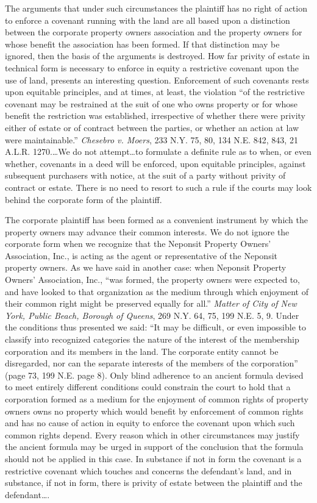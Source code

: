 The arguments that under such circumstances the plaintiff has no right of action
to enforce a covenant running with the land are all based upon a distinction
between the corporate property owners association and the property owners for
whose benefit the association has been formed. If that distinction may be
ignored, then the basis of the arguments is destroyed. How far privity of estate
in technical form is necessary to enforce in equity a restrictive covenant upon
the use of land, presents an interesting question. Enforcement of such covenants
rests upon equitable principles, and at times, at least, the violation ``of the
restrictive covenant may be restrained at the suit of one who owns property or
for whose benefit the restriction was established, irrespective of whether there
were privity either of estate or of contract between the parties, or whether an
action at law were maintainable.'' \emph{Chesebro v. Moers}, 233 N.Y. 75, 80,
134 N.E. 842, 843, 21 A.L.R. 1270.\ldots We do not attempt\ldots to formulate a
definite rule as to when, or even whether, covenants in a deed will be enforced,
upon equitable principles, against subsequent purchasers with notice, at the
suit of a party without privity of contract or estate. There is no need to
resort to such a rule if the courts may look behind the corporate form of the
plaintiff.

The corporate plaintiff has been formed as a convenient instrument by which the
property owners may advance their common interests. We do not ignore the
corporate form when we recognize that the Neponsit Property Owners' Association,
Inc., is acting as the agent or representative of the Neponsit property owners.
As we have said in another case: when Neponsit Property Owners' Association,
Inc., ``was formed, the property owners were expected to, and have looked to
that organization as the medium through which enjoyment of their common right
might be preserved equally for all.'' \emph{Matter of City of New York, Public
Beach, Borough of Queens}, 269 N.Y. 64, 75, 199 N.E. 5, 9. Under the conditions
thus presented we said: ``It may be difficult, or even impossible to classify
into recognized categories the nature of the interest of the membership
corporation and its members in the land. The corporate entity cannot be
disregarded, nor can the separate interests of the members of the corporation''
(page 73, 199 N.E. page 8). Only blind adherence to an ancient formula devised
to meet entirely different conditions could constrain the court to hold that a
corporation formed as a medium for the enjoyment of common rights of property
owners owns no property which would benefit by enforcement of common rights and
has no cause of action in equity to enforce the covenant upon which such common
rights depend. Every reason which in other circumstances may justify the ancient
formula may be urged in support of the conclusion that the formula should not be
applied in this case. In substance if not in form the covenant is a restrictive
covenant which touches and concerns the defendant's land, and in substance, if
not in form, there is privity of estate between the plaintiff and the
defendant\ldots .

